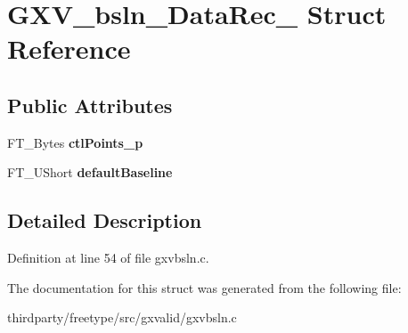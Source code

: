 \hypertarget{struct_g_x_v__bsln___data_rec__}{}\section{G\+X\+V\+\_\+bsln\+\_\+\+Data\+Rec\+\_\+ Struct Reference}
\label{struct_g_x_v__bsln___data_rec__}
\subsection*{Public Attributes}
\begin{DoxyCompactItemize}
\item 
\mbox{\label{struct_g_x_v__bsln___data_rec___a46827712412284771858038c98463f45}} 
F\+T\+\_\+\+Bytes {\bfseries ctl\+Points\+\_\+p}
\item 
\mbox{\label{struct_g_x_v__bsln___data_rec___a736df068fac6c2cd83a4d7d9da6bc493}} 
F\+T\+\_\+\+U\+Short {\bfseries default\+Baseline}
\end{DoxyCompactItemize}


\subsection{Detailed Description}


Definition at line 54 of file gxvbsln.\+c.



The documentation for this struct was generated from the following file\+:\begin{DoxyCompactItemize}
\item 
thirdparty/freetype/src/gxvalid/gxvbsln.\+c\end{DoxyCompactItemize}
